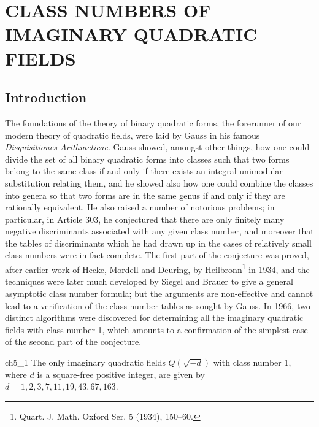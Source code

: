 
\chapter{CLASS NUMBERS OF IMAGINARY QUADRATIC FIELDS}\label{ch:5}


\section{Introduction}\label{sec:ch5_1}

The foundations of the theory of binary quadratic forms, the forerunner of our modern theory of quadratic fields, were laid by Gauss in his famous \textit{Disquisitiones Arithmeticae}. Gauss showed, amongst other things, how one could divide the set of all binary quadratic forms into classes such that two forms belong to the same class if and only if there exists an integral unimodular substitution relating them, and he showed also how one could combine the classes into genera so that two forms are in the same genus if and only if they are rationally equivalent. He also raised a number of notorious problems; in particular, in Article 303, he conjectured that there are only finitely many negative discriminants associated with any given class number, and moreover that the tables of discriminants which he had drawn up in the cases of relatively small class numbers were in fact complete. The first part of the conjecture was proved, after earlier work of Hecke, Mordell and Deuring, by Heilbronn\footnote{Quart. J. Math. Oxford Ser. 5 (1934), 150--60.} in 1934, and the techniques were later much developed by Siegel and Brauer to give a general asymptotic class number formula; but the arguments are non-effective and cannot lead to a verification of the class number tables as sought by Gauss. In 1966, two distinct algorithms were discovered for determining all the imaginary quadratic fields with class number 1, which amounts to a confirmation of the simplest case of the second part of the conjecture.

\begin{mythm}{}{ch5_1}
The only imaginary quadratic fields $Q(\sqrt{-d})$ with class number 1, 
where $d$ is a square-free positive integer, are given by $d = 1, 2, 3, 7, 11, 19, 43, 67, 163$.
\end{mythm}

